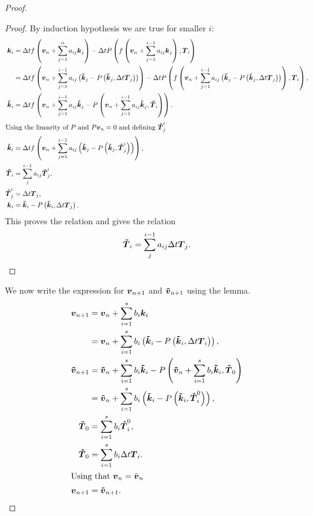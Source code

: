 \begin{proof}
\begin{proof}
By induction hypothesis we are true for smaller $i$:
\begin{align*}
  {\boldsymbol {k}}_{i}&=\Delta tf\left({\boldsymbol {v}}_n+\sum_{j=1}^{n}a_{ij}{\boldsymbol {k}}_{j}\right)-\Delta tP\left(f\left({\boldsymbol {v}}_n+\sum_{j=1}^{i-1}a_{ij}{\boldsymbol {k}}_{j}\right),{\boldsymbol {T}}_{i}\right)\\
  &=\Delta tf\left({\boldsymbol {v}}_n+\sum_{j=1}^{i-1}a_{ij}\left({\boldsymbol {\tilde{k}}}_{j}-P\left({\boldsymbol {\tilde{k}}}_{j},\Delta t {\boldsymbol {T}}_{j}\right)\right)\right)-\Delta tP\left(f\left({\boldsymbol {v}}_n+\sum_{j=1}^{i-1}a_{ij}\left({\boldsymbol {\tilde{k}}}_{j}-P\left({\boldsymbol {\tilde{k}}}_{j},\Delta t {\boldsymbol {T}}_{j}\right)\right)\right),{\boldsymbol {T}}_{i}\right),\\
  {\boldsymbol {\tilde{k}}}_{i}&=\Delta tf\left({\boldsymbol {v}}_n+\sum_{j=1}^{i-1}a_{ij}{\boldsymbol {\tilde{k}}}_{j}-P\left({\boldsymbol {v}}_n+\sum_{j=1}^{i-1}a_{ij}{\boldsymbol {\tilde{k}}}_{j},{\boldsymbol {{\boldsymbol {\tilde{T}}}}}_{i}\right)\right).\\
  \intertext{Using the linearity of $P$ and $P{\boldsymbol {v}}_n=0$ and defining ${\boldsymbol {\hat{T}}}_{j}^i$}
  {\boldsymbol {\tilde{k}}}_{i}&=\Delta tf\left({\boldsymbol {v}}_n+\sum_{j=1}^{i-1}a_{ij}\left({\boldsymbol {\tilde{k}}}_{j}-P\left({\boldsymbol {\tilde{k}}}_{j},{\boldsymbol {\hat{T}}}_{j}^{i}\right)\right)\right),\\
  {\boldsymbol {\tilde{T}}}_i&=\sum_{j}^{i-1}a_{ij}{\boldsymbol {\hat{T}}}_{j}^{i},\\
  {\boldsymbol {\hat{T}}}^{i}_{j}&=\Delta t {\boldsymbol {T}}_{j},\\
  {\boldsymbol {k}}_{i}&={\boldsymbol {\tilde{k}}}_{i}-P\left({\boldsymbol {\tilde{k}}}_{i},\Delta t{\boldsymbol {T}}_j\right).
\end{align*}
This proves the relation and gives the relation
\begin{equation}
  {\boldsymbol {\tilde{T}}}_i=\sum_{j}^{i-1}a_{ij}\Delta t {\boldsymbol {T}}_{j}.
\end{equation}
\end{proof}

We now write the expression for ${\boldsymbol {v}}_{n+1}$ and ${\boldsymbol {\tilde{v}}}_{n+1}$ using the lemma.
\begin{align*}
{\boldsymbol {v}}_{n+1}&={\boldsymbol {v}}_{n}+\sum_{i=1}^{s}b_{i}{\boldsymbol {k}}_{i}\\
&={\boldsymbol {v}}_{n}+\sum_{i=1}^{s}b_{i}\left({\boldsymbol {\tilde{k}}}_{i}-P\left({\boldsymbol {\tilde{k}}}_{i},\Delta t{\boldsymbol {T}}_{i}\right)\right),\\
{\boldsymbol {\tilde{v}}}_{n+1}&={\boldsymbol {\tilde{v}}}_{n}+\sum_{i=1}^{s}b_{i}{\boldsymbol {\tilde{k}}}_{i}-P\left({\boldsymbol {\tilde{v}}}_{n}+\sum_{i=1}^{s}b_{i}{\boldsymbol {\tilde{k}}}_{i},{\boldsymbol {\tilde{T}}}_{0}\right)\\
&={\boldsymbol {\tilde{v}}}_{n}+\sum_{i=1}^{s}b_{i}\left({\boldsymbol {\tilde{k}}}_{i}-P\left({\boldsymbol {\tilde{k}}}_{i},{\boldsymbol {\hat{T}}}_{i}^{0}\right)\right),\\
{\boldsymbol {\tilde{T}}}_{0}&=\sum_{i=1}^{s}b_{i}{\boldsymbol {\hat{T}}}_{i}^{0},\\
{\boldsymbol {\tilde{T}}}_{0}&=\sum_{i=1}^{s}b_{i}\Delta t {\boldsymbol {T}}_{i}.\\
\intertext{Using that ${\boldsymbol {v}}_{n}=\tilde{{\boldsymbol {v}}}_{n}$}
{\boldsymbol {v}}_{n+1}&={\boldsymbol {\tilde{v}}}_{n+1}.
\end{align*}

\end{proof}

